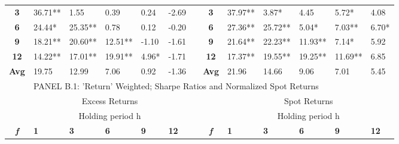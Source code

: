 \documentclass{article}
\begin{document}
\begin{table}[htbp!]
\begin{adjustwidth}{-2cm}{}
\begin{tabular}{ccccccccccccc}
    \textbf{3} & \multicolumn{1}{l}{36.71**} & \multicolumn{1}{l}{1.55} & \multicolumn{1}{l}{0.39} & \multicolumn{1}{l}{0.24} & \multicolumn{1}{l}{-2.69} &       & \textbf{3} & \multicolumn{1}{l}{37.97**} & \multicolumn{1}{l}{3.87*} & \multicolumn{1}{l}{4.45} & \multicolumn{1}{l}{5.72*} & \multicolumn{1}{l}{4.08} \\
    \textbf{6} & \multicolumn{1}{l}{24.44*} & \multicolumn{1}{l}{25.35**} & \multicolumn{1}{l}{0.78} & \multicolumn{1}{l}{0.12} & \multicolumn{1}{l}{-0.20} &       & \textbf{6} & \multicolumn{1}{l}{27.36**} & \multicolumn{1}{l}{25.72**} & \multicolumn{1}{l}{5.04*} & \multicolumn{1}{l}{7.03**} & \multicolumn{1}{l}{6.70*} \\
    \textbf{9} & \multicolumn{1}{l}{18.21**} & \multicolumn{1}{l}{20.60**} & \multicolumn{1}{l}{12.51**} & \multicolumn{1}{l}{-1.10} & \multicolumn{1}{l}{-1.61} &       & \textbf{9} & \multicolumn{1}{l}{21.64**} & \multicolumn{1}{l}{22.23**} & \multicolumn{1}{l}{11.93**} & \multicolumn{1}{l}{7.14*} & \multicolumn{1}{l}{5.92} \\
    \textbf{12} & \multicolumn{1}{l}{14.22**} & \multicolumn{1}{l}{17.01**} & \multicolumn{1}{l}{19.91**} & \multicolumn{1}{l}{4.96*} & \multicolumn{1}{l}{-1.71} &       & \textbf{12} & \multicolumn{1}{l}{17.37**} & \multicolumn{1}{l}{19.55**} & \multicolumn{1}{l}{19.25**} & \multicolumn{1}{l}{11.69**} & \multicolumn{1}{l}{6.85} \\
\cmidrule{2-6}\cmidrule{9-13}    \textbf{Avg} & \multicolumn{1}{l}{19.75} & \multicolumn{1}{l}{12.99} & \multicolumn{1}{l}{7.06} & \multicolumn{1}{l}{0.92} & \multicolumn{1}{l}{-1.36} &       & \textbf{Avg} & \multicolumn{1}{l}{21.96} & \multicolumn{1}{l}{14.66} & \multicolumn{1}{l}{9.06} & \multicolumn{1}{l}{7.01} & \multicolumn{1}{l}{5.45} \\
    \midrule
          & \multicolumn{12}{l}{PANEL B.1: 'Return' Weighted; Sharpe Ratios and Normalized Spot Returns} \\
    \midrule
          & \multicolumn{5}{c}{Excess Returns}    &       &       & \multicolumn{5}{c}{Spot Returns} \\
\cmidrule{2-6}\cmidrule{9-13}          & \multicolumn{5}{c}{Holding period h}  &       &       & \multicolumn{5}{c}{Holding period h} \\
    \textit{\textbf{f}} & \multicolumn{1}{l}{\textbf{1}} & \multicolumn{1}{l}{\textbf{3}} & \multicolumn{1}{l}{\textbf{6}} & \multicolumn{1}{l}{\textbf{9}} & \multicolumn{1}{l}{\textbf{12}} &       & \textit{\textbf{f}} & \multicolumn{1}{l}{\textbf{1}} & \multicolumn{1}{l}{\textbf{3}} & \multicolumn{1}{l}{\textbf{6}} & \multicolumn{1}{l}{\textbf{9}} & \multicolumn{1}{l}{\textbf{12}} \\

\end{tabular}
\end{adjustwidth}
\end{table}
\end{document}

